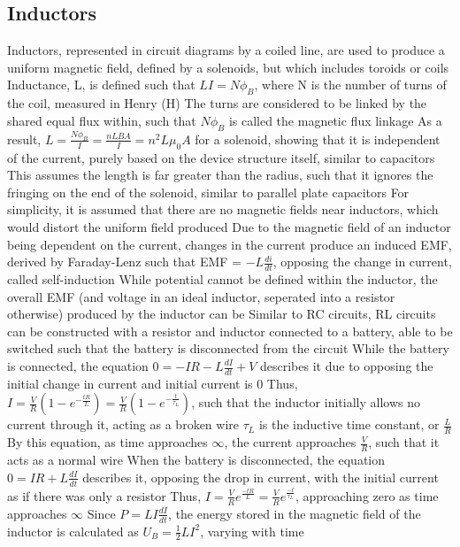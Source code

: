 \documentclass[11 pt, twoside]{article}
\newenvironment{outline*}
{
	\begin{outline}[enumerate]
	}
	{\end{outline}
}
\begin{document}
\subsection{Inductors}
\begin{outline*}
\1 Inductors, represented in circuit diagrams by a coiled line, are used to produce a uniform magnetic field, defined by a solenoids, but which includes toroids or coils
\2 Inductance, L, is defined such that $LI = N\phi_B$, where N is the number of turns of the coil, measured in Henry (H)
\3 The turns are considered to be linked by the shared equal flux within, such that $N\phi_B$ is called the magnetic flux linkage
\3 As a result, $L = \frac{N\phi_B}{I} = \frac{nLBA}{I} = n^2L\mu_0A$ for a solenoid, showing that it is independent of the current, purely based on the device structure itself, similar to capacitors
\4 This assumes the length is far greater than the radius, such that it ignores the fringing on the end of the solenoid, similar to parallel plate capacitors
\2 For simplicity, it is assumed that there are no magnetic fields near inductors, which would distort the uniform field produced
\1 Due to the magnetic field of an inductor being dependent on the current, changes in the current produce an induced EMF, derived by Faraday-Lenz such that EMF = $-L\frac{di}{dt}$, opposing the change in current, called self-induction
\2 While potential cannot be defined within the inductor, the overall EMF (and voltage in an ideal inductor, seperated into a resistor otherwise) produced by the inductor can be
\1 Similar to RC circuits, RL circuits can be constructed with a resistor and inductor connected to a battery, able to be switched such that the battery is disconnected from the circuit
\2 While the battery is connected, the equation $0 = -IR - L\frac{dI}{dt} + V$ describes it due to opposing the initial change in current and initial current is 0
\3 Thus, $I = \frac{V}{R}(1 - e^{-\frac{tR}{L}}) = \frac{V}{R}(1 - e^{-\frac{t}{\tau_L}})$, such that the inductor initially allows no current through it, acting as a broken wire
\3 $\tau_L$ is the inductive time constant, or $\frac{L}{R}$
\3 By this equation, as time approaches $\infty$, the current approaches $\frac{V}{R}$, such that it acts as a normal wire
\2 When the battery is disconnected, the equation $0 = IR + L\frac{dI}{dt}$ describes it, opposing the drop in current, with the initial current as if there was only a resistor
\3 Thus, $I = \frac{V}{R}e^{\frac{-tR}{L}} = \frac{V}{R}e^{\frac{-t}{\tau_L}}$, approaching zero as time approaches $\infty$
\2 Since $P = LI\frac{dI}{dt}$, the energy stored in the magnetic field of the inductor is calculated as $U_B = \frac{1}{2}LI^2$, varying with time

\end{outline*}
\end{document}
